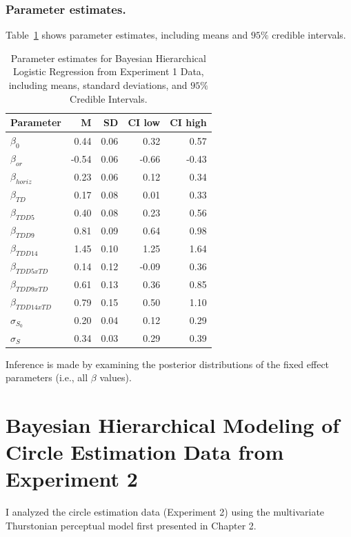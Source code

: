 \subsection{Parameter estimates.}

Table~\ref{tab:e1_params} shows parameter estimates, including means and $95\%$ credible intervals. 
\begin{table}[ht]
    \centering
    \begin{tabular}{lrrrr}
        \toprule
        Parameter & M & SD & CI low & CI high \\
        \midrule
        $\beta_{0}$ & 0.44 & 0.06 & 0.32 & 0.57 \\
        $\beta_{or}$ & -0.54 & 0.06 & -0.66 & -0.43\\
        $\beta_{horiz}$ & 0.23 & 0.06 & 0.12 & 0.34\\
        $\beta_{TD}$ & 0.17 & 0.08 & 0.01 & 0.33\\
        $\beta_{TDD5}$ & 0.40 & 0.08 & 0.23 & 0.56\\
        $\beta_{TDD9}$ & 0.81 & 0.09 & 0.64 & 0.98\\
        $\beta_{TDD14}$ & 1.45 & 0.10 & 1.25 & 1.64\\
        $\beta_{TDD5xTD}$ & 0.14 & 0.12 & -0.09 & 0.36\\
        $\beta_{TDD9xTD}$ & 0.61 & 0.13 & 0.36 & 0.85\\
        $\beta_{TDD14xTD}$ & 0.79 & 0.15 & 0.50 & 1.10\\
        $\sigma_{S_0}$ & 0.20 & 0.04 & 0.12 & 0.29 \\
        $\sigma_{S}$ & 0.34 & 0.03 & 0.29 & 0.39 \\
    \bottomrule 
    \end{tabular}
    \caption{Parameter estimates for Bayesian Hierarchical Logistic Regression from Experiment 1 Data, including means, standard deviations, and $95\%$ Credible Intervals.}
    \label{tab:e1_params}
 \end{table}
    
 Inference is made by examining the posterior distributions of the fixed effect parameters (i.e., all $\beta$ values). 

\chapter{Bayesian Hierarchical Modeling of Circle Estimation Data from Experiment 2}

I analyzed the circle estimation data (Experiment 2) using the multivariate Thurstonian perceptual model first presented in Chapter 2. 

